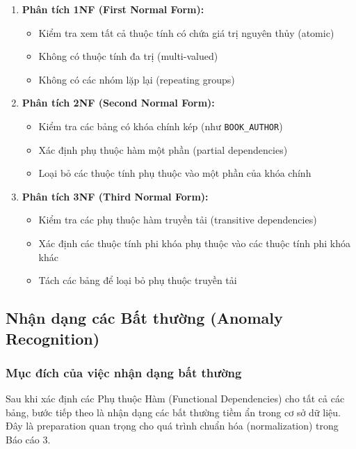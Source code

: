 \documentclass[12pt,a4paper]{article}
\begin{document}
\begin{enumerate}
    \item \textbf{Phân tích 1NF (First Normal Form):}
    \begin{itemize}
        \item Kiểm tra xem tất cả thuộc tính có chứa giá trị nguyên thủy (atomic)
        \item Không có thuộc tính đa trị (multi-valued)
        \item Không có các nhóm lặp lại (repeating groups)
    \end{itemize}

    \item \textbf{Phân tích 2NF (Second Normal Form):}
    \begin{itemize}
        \item Kiểm tra các bảng có khóa chính kép (như \texttt{BOOK\_AUTHOR})
        \item Xác định phụ thuộc hàm một phần (partial dependencies)
        \item Loại bỏ các thuộc tính phụ thuộc vào một phần của khóa chính
    \end{itemize}

    \item \textbf{Phân tích 3NF (Third Normal Form):}
    \begin{itemize}
        \item Kiểm tra các phụ thuộc hàm truyền tải (transitive dependencies)
        \item Xác định các thuộc tính phi khóa phụ thuộc vào các thuộc tính phi khóa khác
        \item Tách các bảng để loại bỏ phụ thuộc truyền tải
    \end{itemize}
\end{enumerate}

\subsection{Nhận dạng các Bất thường (Anomaly Recognition)}

\subsubsection{Mục đích của việc nhận dạng bất thường}

Sau khi xác định các Phụ thuộc Hàm (Functional Dependencies) cho tất cả các bảng, bước tiếp theo là nhận dạng các bất thường tiềm ẩn trong cơ sở dữ liệu. Đây là preparation quan trọng cho quá trình chuẩn hóa (normalization) trong Báo cáo 3.
\end{document}
